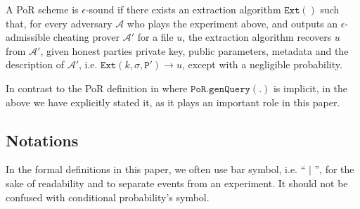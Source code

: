 \begin{definition}\label{extractable} A PoR scheme is $\epsilon$-sound if   there exists an extraction algorithm $\mathtt{Ext}()$ such that, for every adversary $\mathcal{A}$ who plays the experiment above, and outputs an $\epsilon$-admissible cheating prover $\mathcal{A}'$ for a file $u$,  the extraction algorithm  recovers $u$ from $\mathcal{A}'$, given honest parties private key, public parameters, metadata and the description of $\mathcal{A}'$,  i.e. $\mathtt{Ext}(k,\sigma, \mathtt{P}')\rightarrow u$, except with a negligible probability. 
\end{definition}








In contrast to the PoR definition in \cite{DBLP:journals/iacr/JuelsK07,DBLP:conf/asiacrypt/ShachamW08} where $\mathtt{PoR.genQuery}(.)$ is implicit, in the above we have explicitly stated  it, as it    plays an important role in this paper. 

\subsection{Notations} In the formal definitions in this paper, we often use bar symbol, i.e. `` $|$ '', for the sake of readability and to separate events from an experiment. It should not be confused with conditional probability's symbol. 


